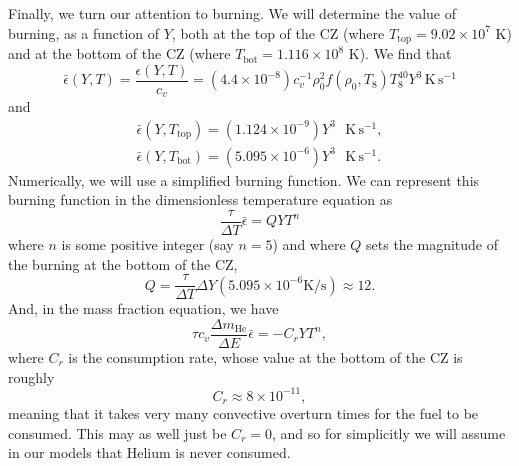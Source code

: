 \documentclass[onecolumn, amsmath, amsfonts, amssymb]{aastex62}
\begin{document}
Finally, we turn our attention to burning.
We will determine the value of burning, as a function of $Y$, both at the top of the CZ (where $T_{\mathrm{top}} = 9.02 \times 10^7$ K) and at the bottom of the CZ (where $T_{\mathrm{bot}} = 1.116 \times 10^8$ K).
We find that
\begin{equation}
\bar{\epsilon}(Y, T) = \frac{\epsilon(Y, T)}{c_v} = (4.4 \times 10^{-8})c_v^{-1}\rho_0^2 f(\rho_0, T_8) T_8^{40} Y^3 \,\mathrm{K}\,\mathrm{s}^{-1}
\end{equation}
and
\begin{align}
\bar{\epsilon}(Y, T_{\mathrm{top}}) = (1.124 \times 10^{-9}) Y^3\,\,\,\,\mathrm{K}\,\mathrm{s}^{-1}, \\
\bar{\epsilon}(Y, T_{\mathrm{bot}}) = (5.095 \times 10^{-6}) Y^3\,\,\,\,\mathrm{K}\,\mathrm{s}^{-1}.
\end{align}
Numerically, we will use a simplified burning function.
We can represent this burning function in the dimensionless temperature equation as
\begin{equation}
\frac{\tau}{\Delta T}\bar{\epsilon} = Q Y T^{n}
\end{equation}
where $n$ is some positive integer (say $n = 5$) and where $Q$ sets the magnitude of the burning at the bottom of the CZ,
\begin{equation}
Q = \frac{\tau}{\Delta T} \Delta Y (5.095 \times 10^{-6} \mathrm{   K / s}) \approx 12.
\end{equation}
And, in the mass fraction equation, we have
\begin{equation}
\tau c_v \frac{\Delta m_{\mathrm{He}}}{\Delta E} \bar{\epsilon} = -C_r Y T^n,
\end{equation}
where $C_r$ is the consumption rate, whose value at the bottom of the CZ is roughly
\begin{equation}
C_r \approx 8 \times 10^{-11},
\end{equation}
meaning that it takes very many convective overturn times for the fuel to be consumed.
This may as well just be $C_r = 0$, and so for simplicitly we will assume in our models that Helium is never consumed.
\end{document}
